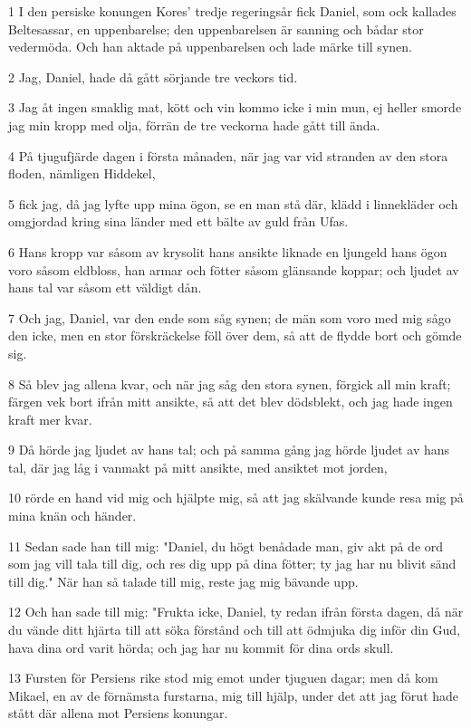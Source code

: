 \par 1 I den persiske konungen Kores' tredje regeringsår fick Daniel, som ock kallades Beltesassar, en uppenbarelse; den uppenbarelsen är sanning och bådar stor vedermöda. Och han aktade på uppenbarelsen och lade märke till synen.
\par 2 Jag, Daniel, hade då gått sörjande tre veckors tid.
\par 3 Jag åt ingen smaklig mat, kött och vin kommo icke i min mun, ej heller smorde jag min kropp med olja, förrän de tre veckorna hade gått till ända.
\par 4 På tjugufjärde dagen i första månaden, när jag var vid stranden av den stora floden, nämligen Hiddekel,
\par 5 fick jag, då jag lyfte upp mina ögon, se en man stå där, klädd i linnekläder och omgjordad kring sina länder med ett bälte av guld från Ufas.
\par 6 Hans kropp var såsom av krysolit hans ansikte liknade en ljungeld hans ögon voro såsom eldbloss, han armar och fötter såsom glänsande koppar; och ljudet av hans tal var såsom ett väldigt dån.
\par 7 Och jag, Daniel, var den ende som såg synen; de män som voro med mig sågo den icke, men en stor förskräckelse föll över dem, så att de flydde bort och gömde sig.
\par 8 Så blev jag allena kvar, och när jag såg den stora synen, förgick all min kraft; färgen vek bort ifrån mitt ansikte, så att det blev dödsblekt, och jag hade ingen kraft mer kvar.
\par 9 Då hörde jag ljudet av hans tal; och på samma gång jag hörde ljudet av hans tal, där jag låg i vanmakt på mitt ansikte, med ansiktet mot jorden,
\par 10 rörde en hand vid mig och hjälpte mig, så att jag skälvande kunde resa mig på mina knän och händer.
\par 11 Sedan sade han till mig: "Daniel, du högt benådade man, giv akt på de ord som jag vill tala till dig, och res dig upp på dina fötter; ty jag har nu blivit sänd till dig." När han så talade till mig, reste jag mig bävande upp.
\par 12 Och han sade till mig: "Frukta icke, Daniel, ty redan ifrån första dagen, då när du vände ditt hjärta till att söka förstånd och till att ödmjuka dig inför din Gud, hava dina ord varit hörda; och jag har nu kommit för dina ords skull.
\par 13 Fursten för Persiens rike stod mig emot under tjuguen dagar; men då kom Mikael, en av de förnämsta furstarna, mig till hjälp, under det att jag förut hade stått där allena mot Persiens konungar.
